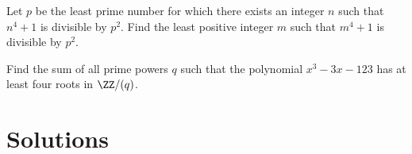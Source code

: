 \documentclass[11pt]{scrartcl}
\begin{document}
\begin{exercise}[AIME I 2024/13]\label{exe:aime_lift}
    Let $p$ be the least prime number for which there exists an integer $n$ such that $n^4 + 1$ is divisible by $p^2$. Find the least positive integer $m$ such that $m^4 + 1$ is divisible by $p^2$.
\end{exercise}

\begin{exercise}[Brilliant]\label{exe:cubic_with_four_roots}
    Find the sum of all prime powers $q$ such that the polynomial $x^3 - 3x - 123$ has at least four roots in $\ZZ/(q)$.
\end{exercise}

\pagebreak

\section{Solutions}
\end{document}
